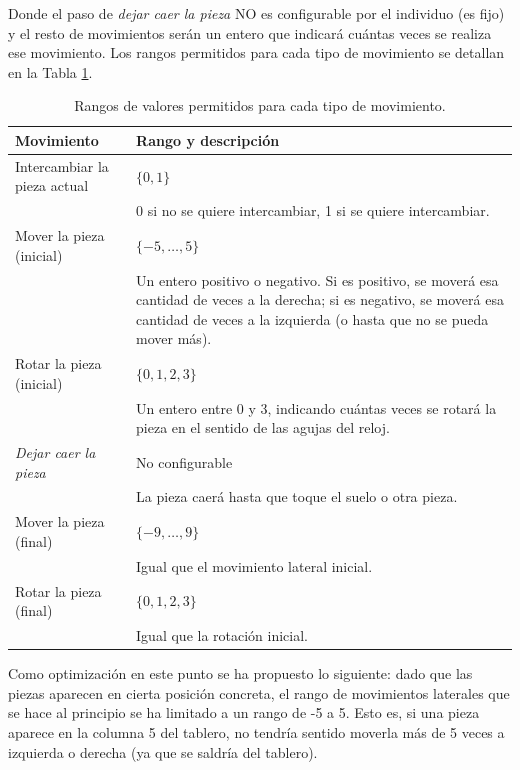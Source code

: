 \documentclass[11pt,spanish,listoffigures,listoftables]{tfgetsinf}
\begin{document}
Donde el paso de \textit{dejar caer la pieza} NO es configurable por el individuo (es fijo) y el resto de movimientos serán un entero que indicará cuántas veces se realiza ese movimiento. Los rangos permitidos para cada tipo de movimiento se detallan en la Tabla \ref{tab:rangos_movimientos}.

\begin{table}[H]
    \centering
    \begin{tabular}{lp{8cm}}
        \toprule
        \textbf{Movimiento} & \textbf{Rango y descripción} \\
        \midrule
        Intercambiar la pieza actual & $\{0, 1\}$ \\ 
        & 0 si no se quiere intercambiar, 1 si se quiere intercambiar. \\
        \midrule
        Mover la pieza (inicial) & $\{-5, \dots, 5\}$ \\ 
        & Un entero positivo o negativo. Si es positivo, se moverá esa cantidad de veces a la derecha; si es negativo, se moverá esa cantidad de veces a la izquierda (o hasta que no se pueda mover más). \\
        \midrule
        Rotar la pieza (inicial) & $\{0, 1, 2, 3\}$ \\ 
        & Un entero entre 0 y 3, indicando cuántas veces se rotará la pieza en el sentido de las agujas del reloj. \\
        \midrule
        \textit{Dejar caer la pieza} & No configurable \\ 
        & La pieza caerá hasta que toque el suelo o otra pieza. \\
        \midrule
        Mover la pieza (final) & $\{-9, \dots, 9\}$ \\ 
        & Igual que el movimiento lateral inicial. \\
        \midrule
        Rotar la pieza (final) & $\{0, 1, 2, 3\}$ \\ 
        & Igual que la rotación inicial. \\
        \bottomrule
    \end{tabular}
    \caption{Rangos de valores permitidos para cada tipo de movimiento.}
    \label{tab:rangos_movimientos}
\end{table}

Como optimización en este punto se ha propuesto lo siguiente: dado que las piezas aparecen en cierta posición concreta, el rango de movimientos laterales que se hace al principio se ha limitado a un rango de -5 a 5. Esto es, si una pieza aparece en la columna 5 del tablero, no tendría sentido moverla más de 5 veces a izquierda o derecha (ya que se saldría del tablero).
\end{document}
